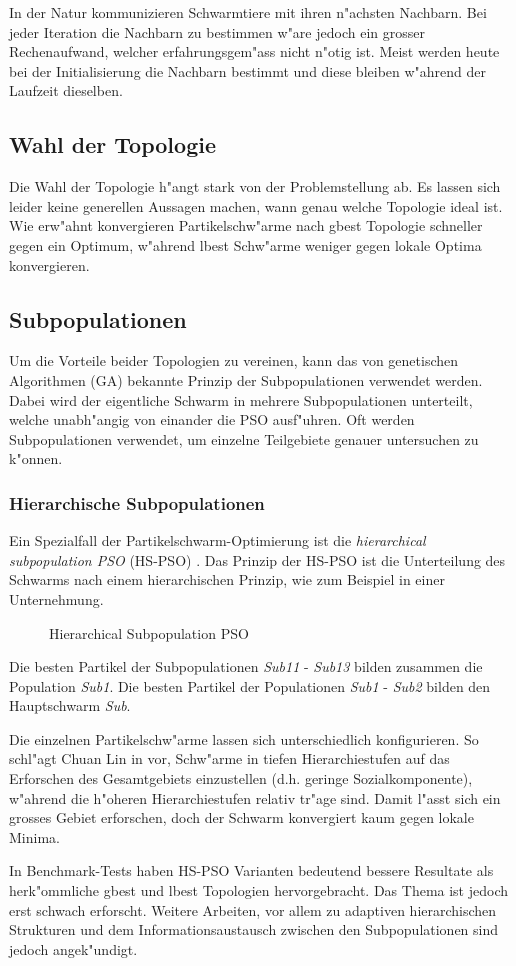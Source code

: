 In der Natur kommunizieren Schwarmtiere mit ihren n"achsten Nachbarn. Bei
jeder Iteration die Nachbarn zu bestimmen w"are jedoch ein grosser
Rechenaufwand, welcher erfahrungsgem"ass nicht n"otig ist. Meist werden
heute bei der Initialisierung die Nachbarn bestimmt und diese bleiben
w"ahrend der Laufzeit dieselben.

\subsection{Wahl der Topologie}
Die Wahl der Topologie h"angt stark von der Problemstellung ab. Es
lassen sich leider keine generellen Aussagen machen, wann genau welche
Topologie ideal ist. Wie erw"ahnt konvergieren Partikelschw"arme nach
gbest Topologie schneller gegen ein Optimum, w"ahrend lbest Schw"arme
weniger gegen lokale Optima konvergieren.

\subsection{Subpopulationen}
Um die Vorteile beider Topologien zu vereinen, kann das von genetischen
Algorithmen (GA) bekannte Prinzip der Subpopulationen verwendet
werden. Dabei wird der eigentliche Schwarm in mehrere Subpopulationen
unterteilt, welche unabh"angig von einander die PSO ausf"uhren. Oft werden
Subpopulationen verwendet, um einzelne Teilgebiete genauer untersuchen
zu k"onnen.


\subsubsection{Hierarchische Subpopulationen}
Ein Spezialfall der Partikelschwarm-Optimierung ist
die \textit{hierarchical subpopulation PSO} (HS-PSO)
\cite{ChuanLin-HSPSO}. Das Prinzip der HS-PSO ist die Unterteilung des
Schwarms nach einem hierarchischen Prinzip, wie zum Beispiel in einer
Unternehmung.

\begin{figure}[htbp]
	\centering
	\caption{Hierarchical Subpopulation PSO}
	\label{hs-pso}
\end{figure}

Die besten Partikel der Subpopulationen \textit{Sub11} - \textit{Sub13}
bilden zusammen die Population \textit{Sub1}. Die besten Partikel der
Populationen \textit{Sub1} - \textit{Sub2} bilden den Hauptschwarm
\textit{Sub}.

Die einzelnen Partikelschw"arme lassen sich unterschiedlich
konfigurieren. So schl"agt Chuan Lin in \cite{ChuanLin-HSPSO} vor,
Schw"arme in tiefen Hierarchiestufen auf das Erforschen des Gesamtgebiets
einzustellen (d.h. geringe Sozialkomponente), w"ahrend die h"oheren
Hierarchiestufen relativ tr"age sind. Damit l"asst sich ein grosses Gebiet
erforschen, doch der Schwarm konvergiert kaum gegen lokale Minima.

In Benchmark-Tests haben HS-PSO Varianten bedeutend bessere Resultate als
herk"ommliche gbest und lbest Topologien hervorgebracht. Das Thema ist
jedoch erst schwach erforscht. Weitere Arbeiten, vor allem zu adaptiven
hierarchischen Strukturen und dem Informationsaustausch zwischen den
Subpopulationen sind jedoch angek"undigt.

